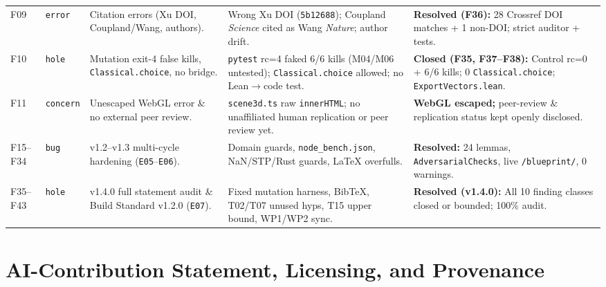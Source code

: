 \documentclass[11pt,letterpaper]{amsart}
\begin{document}
\begin{table}[htbp]
\begin{tabularx}{\textwidth}{@{}ll>{\raggedright\arraybackslash}p{3.05cm}>{\raggedright\arraybackslash}p{4.35cm}L@{}}
F09 & \texttt{error} & Citation errors (Xu DOI, Coupland/Wang, authors). & Wrong Xu DOI (\texttt{5b12688}); Coupland \emph{Science} cited as Wang \emph{Nature}; author drift. & \textbf{Resolved (F36):} 28 Crossref DOI matches + 1 non-DOI; strict auditor + tests. \\
F10 & \texttt{hole} & Mutation exit-4 false kills, \texttt{Classical.choice}, no bridge. & \texttt{pytest} rc=4 faked 6/6 kills (M04/M06 untested); \texttt{Classical.choice} allowed; no Lean$\to$code test. & \textbf{Closed (F35, F37--F38):} Control rc=0 + 6/6 kills; 0 \texttt{Classical.choice}; \texttt{ExportVectors.lean}. \\
F11 & \texttt{concern} & Unescaped WebGL error \& no external peer review. & \texttt{scene3d.ts} raw \texttt{innerHTML}; no unaffiliated human replication or peer review yet. & \textbf{WebGL escaped;} peer-review \& replication status kept openly disclosed. \\
F15--F34 & \texttt{bug} & v1.2--v1.3 multi-cycle hardening (\texttt{E05}--\texttt{E06}). & Domain guards, \texttt{node\_bench.json}, NaN/STP/Rust guards, LaTeX overfulls. & \textbf{Resolved:} 24 lemmas, \texttt{AdversarialChecks}, live \texttt{/blueprint/}, 0 warnings. \\
F35--F43 & \texttt{hole} & v1.4.0 full statement audit \& Build Standard v1.2.0 (\texttt{E07}). & Fixed mutation harness, BibTeX, T02/T07 unused hyps, T15 upper bound, WP1/WP2 sync. & \textbf{Resolved (v1.4.0):} All 10 finding classes closed or bounded; 100\% audit. \\
\bottomrule
\end{tabularx}
\end{table}

\section{AI-Contribution Statement, Licensing, and Provenance}
\end{document}

